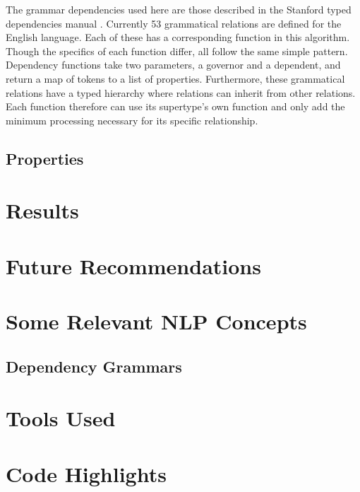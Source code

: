 \documentclass[11pt]{article}
\begin{document}
The grammar dependencies used here are those described in the Stanford typed dependencies manual \cite{stanforddep}.  Currently 53 grammatical relations are defined for the English language.  Each of these has a corresponding function in this algorithm.  Though the specifics of each function differ, all follow the same simple pattern.  Dependency functions take two parameters, a governor and a dependent, and return a map of tokens to a list of properties.  Furthermore, these grammatical relations have a typed hierarchy where relations can inherit from other relations.  Each function therefore can use its supertype's own function and only add the minimum processing necessary for its specific relationship.


\subsection{Properties}
\label{algo:properties}


\section{Results}

\section{Future Recommendations}

\appendix

\section{Some Relevant NLP Concepts}

\subsection{Dependency Grammars}

\section{Tools Used}

\section{Code Highlights}


\pagebreak

  
\end{document}
